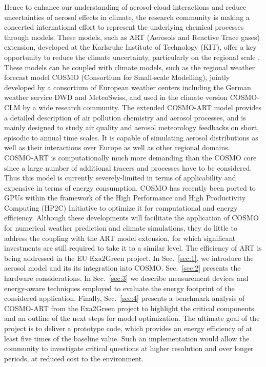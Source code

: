 \noindent 
Hence to  enhance our understanding of  aerosol-cloud interactions and
reduce  uncertainties  of aerosol  effects  in  climate, the  research
community is making a  concerted international effort to represent the
underlying chemical  processes through models.  These  models, such as
ART (Aerosols  and Reactive Trace  gases) extension, developed  at the
Karlsruhe Institute  of Technology (KIT),  offer a key  opportunity to
reduce   the  climate  uncertainty,   particularly  on   the  regional
scale \citep{Knote-2011, Bangert-2011,  Knote-2013}.  These models can
be coupled with climate models,  such as the regional weather forecast
model COSMO (Consortium  for Small-scale Modelling), jointly developed
by  a consortium  of  European weather  centers  including the  German
weather service  DWD and MeteoSwiss,  and used in the  climate version
COSMO-CLM by a wide  research community.  The extended COSMO-ART model
provides a detailed description of air pollution chemistry and aerosol
processes, and  is mainly  designed to study  air quality  and aerosol
meteorology feedbacks on short, episodic to annual time scales.  It is
capable  of   simulating  aerosol  distributions  as   well  as  their
interactions over Europe as well as other regional domains.\\

\noindent 
COSMO-ART is  computationally much more demanding than  the COSMO core
since a  large number of additional  tracers and processes  have to be
considered.  Thus this model is currently severely-limited in terms of
applicability and expensive in terms of energy consumption.  COSMO has
recently  been  ported  to  GPUs  within the  framework  of  the  High
Performance  and  High  Productivity  Computing (HP2C)  Initiative  to
optimize it  for computational and energy  efficiency.  Although these
developments will  facilitate the  application of COSMO  for numerical
weather prediction and climate  simulations, they do little to address
the  coupling with  the  ART model  extension,  for which  significant
investments  are still required  to take  it to  a similar  level. The
efficiency of ART is being  addressed in the EU Exa2Green project.  In
Sec.~\ref{sec:1},  we   introduce  the  aerosol  model   and  its  its
integration  into  COSMO.    Sec.~\ref{sec:2}  presents  the  hardware
considerations.  In  Sec.~\ref{sec:3} we describe  measurement devices
and energy-aware techniques employed  to evaluate the energy footprint
of the  considered application.  Finally,  Sec.~\ref{sec:4} presents a
benchmark  analysis  of  COSMO-ART   from  the  Exa2Green  project  to
highlight the critical components and an outline of the next steps for
model optimization.  The ultimate goal  of the project is to deliver a
prototype code, which  provides an energy efficiency of  at least five
times of the  baseline value.  Such an implementation  would allow the
community to  investigate critical questions at  higher resolution and
over longer periods, at reduced cost to the environment.
